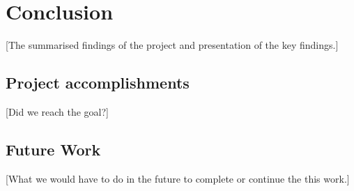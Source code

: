 \section{Conclusion}\label{Conclusion}
[The summarised findings of the project and presentation of the key findings.]
    \subsection{Project accomplishments}\label{Project accomplishments}
    [Did we reach the goal?]
    \subsection{Future Work}\label{Future Work}
    [What we would have to do in the future to complete or continue the this work.]
